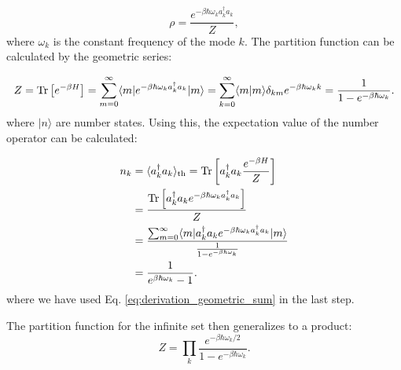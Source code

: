\begin{equation} \label{eq:single_mode_density_matrix}
\rho = \frac{e^{-\beta \hbar \omega_k a_k^{\dagger} a_k}}{Z},
\end{equation}
where \( \omega_k \) is the constant frequency of the mode \( k \).
The partition function can be calculated by the geometric series:

\begin{equation} \label{eq:partition_function}
    Z = \Tr\left[e^{-\beta H}\right] = \sum_{m=0}^{\infty} \langle m | e^{-\beta \hbar \omega_k a_k^{\dagger} a_k} | m \rangle
    = \sum_{k=0}^{\infty} \langle m | m \rangle \delta_{km} e^{-\beta \hbar \omega_k k} \\
    = \frac{1}{1 - e^{-\beta \hbar \omega_k}}. %
\end{equation}
where \(|n\rangle\) are number states. 
Using this, the expectation value of the number operator can be calculated:

\begin{align} \label{eq:expectation_number_operator}
n_k &= \langle a_k^{\dagger} a_k \rangle_{\text{th}} = \mathrm{Tr} \left[ a_k^{\dagger} a_k \frac{e^{-\beta H}}{Z} \right] \\
    &= \frac{\mathrm{Tr} \left[ a_k^{\dagger} a_k e^{-\beta \hbar \omega_k a_k^{\dagger} a_k} \right]}{Z} \\
    &= \frac{\sum_{m=0}^{\infty} \langle m|a_k^{\dagger} a_k e^{-\beta \hbar \omega_k a_k^{\dagger} a_k}|m \rangle}{\frac{1}{1 - e^{-\beta \hbar \omega_k}}} \\
    &= \frac{1}{e^{\beta \hbar \omega_k} - 1}.
\end{align}
where we have used Eq. \eqref{eq:derivation_geometric_sum} in the last step.

The partition function for the infinite set then generalizes to a product:
\begin{equation} \label{eq:generalized_partition_function}
Z = \prod_k \frac{e^{-\beta \hbar \omega_k / 2}}{1 - e^{-\beta \hbar \omega_k}}.
\end{equation}


